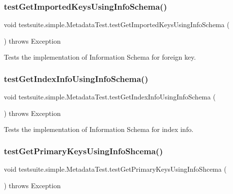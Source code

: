 \subsubsection{\texorpdfstring{test\+Get\+Imported\+Keys\+Using\+Info\+Schema()}{testGetImportedKeysUsingInfoSchema()}}
{\footnotesize\ttfamily void testsuite.\+simple.\+Metadata\+Test.\+test\+Get\+Imported\+Keys\+Using\+Info\+Schema (\begin{DoxyParamCaption}{ }\end{DoxyParamCaption}) throws Exception}

Tests the implementation of Information Schema for foreign key. \mbox{\label{classtestsuite_1_1simple_1_1_metadata_test_ab4ebb88c45acf9e7ce6b2420037c0153}} 
\subsubsection{\texorpdfstring{test\+Get\+Index\+Info\+Using\+Info\+Schema()}{testGetIndexInfoUsingInfoSchema()}}
{\footnotesize\ttfamily void testsuite.\+simple.\+Metadata\+Test.\+test\+Get\+Index\+Info\+Using\+Info\+Schema (\begin{DoxyParamCaption}{ }\end{DoxyParamCaption}) throws Exception}

Tests the implementation of Information Schema for index info. \mbox{\label{classtestsuite_1_1simple_1_1_metadata_test_aec0bf7b994940c84160bf6100daf09bd}} 
\subsubsection{\texorpdfstring{test\+Get\+Primary\+Keys\+Using\+Info\+Shcema()}{testGetPrimaryKeysUsingInfoShcema()}}
{\footnotesize\ttfamily void testsuite.\+simple.\+Metadata\+Test.\+test\+Get\+Primary\+Keys\+Using\+Info\+Shcema (\begin{DoxyParamCaption}{ }\end{DoxyParamCaption}) throws Exception}

